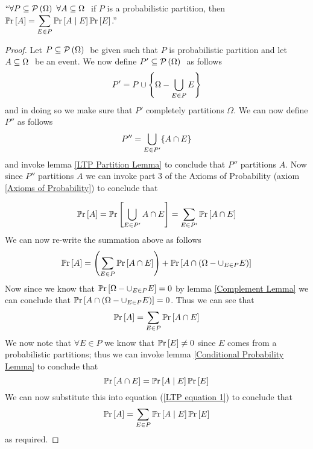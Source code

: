         \begin{theorem}
            $``\forall P \subseteq \mathcal{P}\left(\Omega\right) \  \forall A \subseteq \Omega \ $
            if $P$ is a probabilistic partition, then $\mathbb{P}\mathrm{r} \left[A\right] = \displaystyle\sum_{E \in P} \mathbb{P}\mathrm{r}\left[A \mid E\right] \mathbb{P}\mathrm{r} \left[E\right]$.''
            \label{The Law of Total Probability}
        \end{theorem}
        \begin{proof}
            Let $P \subseteq \mathcal{P}\left(\Omega\right) \ $ be given such that $P$ is probabilistic partition
            and let $A \subseteq \Omega \ $ be an event. We now define $P' \subseteq \mathcal{P}\left(\Omega\right) \ $
            as follows
            \[
                P' = P \cup \left\{\Omega - \displaystyle\bigcup_{E \in P} E\right\}
            \]
            and in doing so we make sure that $P'$ completely partitions $\Omega$. We
            can now define $P''$ as follows
            \[
                P'' = \displaystyle\bigcup_{E \in P'} \{A \cap E\}
            \]
            and invoke lemma \ref{LTP Partition Lemma} to conclude that $P''$ partitions $A$.
            Now since $P''$ partitions $A$ we can invoke part 3 of the Axioms of Probability
            (axiom \ref{Axioms of Probability}) to conclude that

            \[
                \mathbb{P}\mathrm{r} \left[A\right] = \mathbb{P}\mathrm{r} \left[\displaystyle\bigcup_{E \in P'} A \cap E\right] = \sum_{E \in P'} \mathbb{P}\mathrm{r} \left[A \cap E\right]
            \]
            We can now re-write the summation above as follows
            \[
                \mathbb{P}\mathrm{r} \left[A\right] = \left(\sum_{E \in P} \mathbb{P}\mathrm{r} \left[A \cap E\right]\right) + \mathbb{P}\mathrm{r} \left[A \cap \left(\Omega - \cup_{E \in P} E\right)\right]
            \]
            Now since we know that $\mathbb{P}\mathrm{r} \left[\Omega - \cup_{E \in P} E\right] = 0$ by lemma \ref{Complement Lemma}
            we can conclude that $\mathbb{P}\mathrm{r} \left[A \cap \left(\Omega - \cup_{E \in P} E\right)\right] = 0$. Thus
            we can see that
            \begin{equation}
                \mathbb{P}\mathrm{r} \left[A\right] = \sum_{E \in P} \mathbb{P}\mathrm{r} \left[A \cap E\right]
                \label{LTP equation 1}
            \end{equation}
            We now note that $\forall E \in P$ we know that $\mathbb{P}\mathrm{r} \left[E\right] \neq 0$ since $E$ comes
            from a probabilistic partitions; thus we can invoke lemma \ref{Conditional Probability Lemma}
            to conclude that
            \[
                \mathbb{P}\mathrm{r} \left[A \cap E\right] = \mathbb{P}\mathrm{r}\left[A \mid E\right] \mathbb{P}\mathrm{r} \left[E\right]
            \]
            We can now substitute this into equation (\ref{LTP equation 1})
            to conclude that 
            \[
                \mathbb{P}\mathrm{r} \left[A\right] = \sum_{E \in P} \mathbb{P}\mathrm{r}\left[A \mid E\right] \mathbb{P}\mathrm{r} \left[E\right]
            \]
            as required. \QED
        \end{proof}
